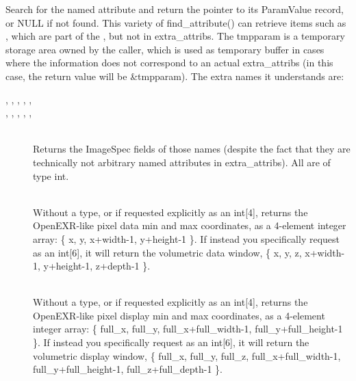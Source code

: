 Search for the named attribute and return the pointer to its
{\cf ParamValue} record, or {\cf NULL} if not found.  This variety of
{\cf find_attribute(}) can retrieve items such as , which are
part of the \ImageSpec, but not in {\cf extra_attribs}. The {\cf tmpparam}
is a temporary storage area owned by the caller, which is used as temporary
buffer in cases where the information does not correspond to an actual
{\cf extra_attribs} (in this case, the return value will be {\cf \&tmpparam}).
The extra names it understands are:
\begin{description}
\item[\spc]
\item[\rm {}, , , , , ]
\item[\rm {}, , ,
  , , ] \spc\\
  Returns the {\cf ImageSpec} fields of those names (despite the fact that
  they are technically not arbitrary named attributes in {\cf extra_attribs}).
  All are of type {\cf int}.
\item[\rm {}] \spc\\
  Without a type, or if requested explicitly as an {\cf int[4]}, returns the
  OpenEXR-like pixel data min and max coordinates, as a 4-element integer
  array: {\cf \{ x, y, x+width-1, y+height-1 \}}.  If instead you specifically
  request as an {\cf int[6]}, it will return the volumetric data window,
  {\cf \{ x, y, z, x+width-1, y+height-1, z+depth-1 \}}.
\item[\rm {}] \spc\\
  Without a type, or if requested explicitly as an {\cf int[4]}, returns the
  OpenEXR-like pixel display min and max coordinates, as a 4-element integer
  array: {\cf \{ full_x, full_y, full_x+full_width-1, full_y+full_height-1 \}}.
  If instead you specifically
  request as an {\cf int[6]}, it will return the volumetric display window,
  {\cf \{ full_x, full_y, full_z, full_x+full_width-1, full_y+full_height-1, full_z+full_depth-1 \}}.
\end{description}

